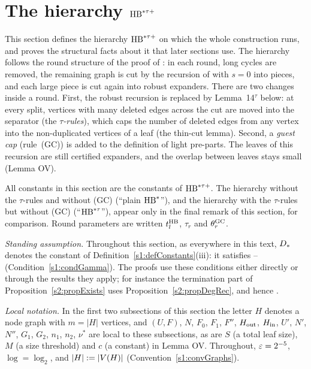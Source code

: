\section{The hierarchy \texorpdfstring{$\mathrm{HB}^{*\tau{+}}$}{HB*tau+}}\label{s2:sec}

This section defines the hierarchy $\mathrm{HB}^{*\tau{+}}$ on which the whole construction
runs, and proves the structural facts about it that later sections use. The
hierarchy follows the round structure of the proof of \cite[Theorem~2]{BM}:
in each round, long cycles are removed, the remaining graph is cut by the
recursion of \cite[Lemma~14]{BM} with $s=0$ into pieces, and each large piece
is cut again into robust expanders. There are two changes inside a round.
First, the robust recursion is replaced by Lemma~14$^\tau$ below: at every
split, vertices with many deleted edges across the cut are moved into the
separator (the \emph{$\tau$-rules}), which caps the number of deleted edges
from any vertex into the non-duplicated vertices of a leaf (the thin-cut
lemma). Second, a \emph{guest cap}
(rule~(GC)) is added to the definition of light pre-parts. The leaves of this
recursion are still certified expanders, and the overlap between leaves stays
small (Lemma OV).

All constants in this section are the constants of $\mathrm{HB}^{*\tau{+}}$. The
hierarchy without the $\tau$-rules and without (GC) (``plain $\mathrm{HB}^{*}$''), and the
hierarchy with the $\tau$-rules but without (GC) (``$\mathrm{HB}^{*\tau}$''), appear only in
the final remark of this section, for comparison. Round parameters are written
$t^{\mathrm{HB}}_l$, $\tau_r$ and $\theta^{\mathrm{GC}}_r$.

\emph{Standing assumption.} Throughout this section, as everywhere in this
text, $D_{*}$ denotes the constant of Definition~\ref{s1:defConstants}(iii):
it satisfies -- (Condition~\ref{s1:condGamma}). The proofs use
these conditions either directly or through the results they apply; for
instance the termination part of Proposition~\ref{s2:propExists} uses
Proposition~\ref{s2:propDegRec}, and hence .

\emph{Local notation.} In the first two subsections of this section the
letter $H$ denotes a node graph with $m=|H|$ vertices, and $(U,F)$, $N$,
$F_0$, $F_1$, $F''$, $H_{\mathrm{out}}$, $H_{\mathrm{in}}$, $U'$, $N'$, $N''$, $G_1$, $G_2$, $n_1$,
$n_2$, $\nu^*$ are local to these subsections, as are $S$ (a total leaf
size), $M$ (a size threshold) and $c$ (a constant) in
Lemma OV. Throughout, $\varepsilon=2^{-5}$, $\log=\log_2$, and
$|H|\mathrel{:=}|V(H)|$ (Convention~\ref{s1:convGraphs}).

